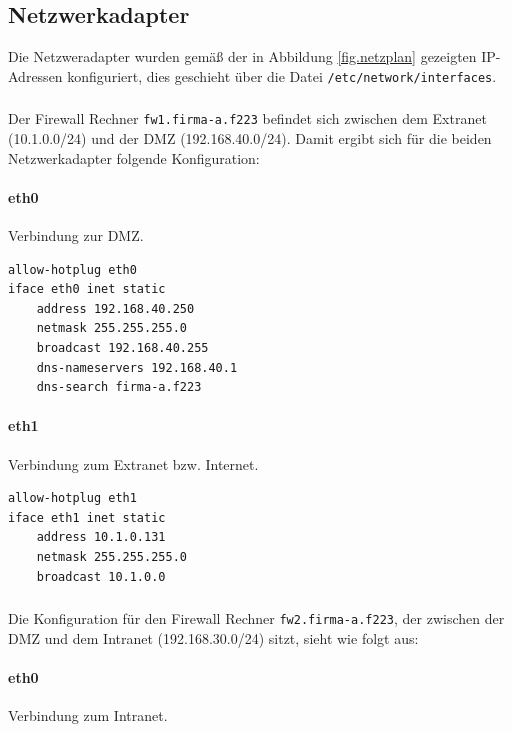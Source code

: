 \subsection{Netzwerkadapter}\label{sec.netzwerk}

Die Netzweradapter wurden gemäß der in Abbildung \ref{fig.netzplan}
gezeigten IP-Adressen konfiguriert, dies geschieht über die Datei
{\tt /etc/network/interfaces}.

\subsubsection{\fwa}

Der Firewall Rechner {\tt fw1.firma-a.f223} befindet sich zwischen dem Extranet
(10.1.0.0/24) und der DMZ (192.168.40.0/24).
Damit ergibt sich für die beiden Netzwerkadapter folgende Konfiguration:

\paragraph{eth0} Verbindung zur DMZ.

\begin{lstlisting}[label=lst:fw1:eth0,caption={Netzwerkadapter eth0 Konfiguration.}]
allow-hotplug eth0
iface eth0 inet static
    address 192.168.40.250
    netmask 255.255.255.0
    broadcast 192.168.40.255
    dns-nameservers 192.168.40.1
    dns-search firma-a.f223
\end{lstlisting}

\paragraph{eth1} Verbindung zum Extranet bzw. Internet.

\begin{lstlisting}[label=lst:fw1:eth1,caption={Netzwerkadapter eth1 Konfiguration.}]
allow-hotplug eth1
iface eth1 inet static
    address 10.1.0.131
    netmask 255.255.255.0
    broadcast 10.1.0.0
\end{lstlisting}


\subsubsection{\fwb}

Die Konfiguration für den Firewall Rechner {\tt fw2.firma-a.f223}, der zwischen
der DMZ und dem Intranet (192.168.30.0/24) sitzt, sieht wie folgt aus:

\paragraph{eth0} Verbindung zum Intranet.

